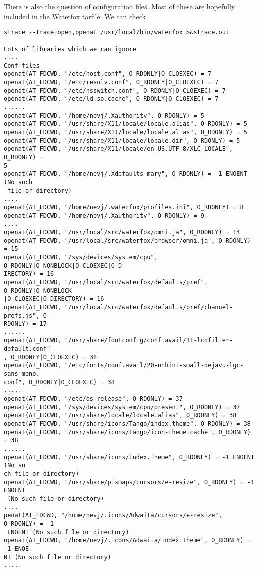 \documentclass{article}  %
\begin{document}
There is also the question of configuration files. Most of these are hopefully included in the Waterfox tarfile. We can check
\begin{verbatim}
strace --trace=open,openat /usr/local/bin/waterfox >&strace.out

Lots of libraries which we can ignore
....
Conf files
openat(AT_FDCWD, "/etc/host.conf", O_RDONLY|O_CLOEXEC) = 7
openat(AT_FDCWD, "/etc/resolv.conf", O_RDONLY|O_CLOEXEC) = 7
openat(AT_FDCWD, "/etc/nsswitch.conf", O_RDONLY|O_CLOEXEC) = 7
openat(AT_FDCWD, "/etc/ld.so.cache", O_RDONLY|O_CLOEXEC) = 7
......
openat(AT_FDCWD, "/home/nevj/.Xauthority", O_RDONLY) = 5
openat(AT_FDCWD, "/usr/share/X11/locale/locale.alias", O_RDONLY) = 5
openat(AT_FDCWD, "/usr/share/X11/locale/locale.alias", O_RDONLY) = 5
openat(AT_FDCWD, "/usr/share/X11/locale/locale.dir", O_RDONLY) = 5
openat(AT_FDCWD, "/usr/share/X11/locale/en_US.UTF-8/XLC_LOCALE", O_RDONLY) = 
5
openat(AT_FDCWD, "/home/nevj/.Xdefaults-mary", O_RDONLY) = -1 ENOENT (No such
 file or directory)
....
openat(AT_FDCWD, "/home/nevj/.waterfox/profiles.ini", O_RDONLY) = 8
openat(AT_FDCWD, "/home/nevj/.Xauthority", O_RDONLY) = 9
....
openat(AT_FDCWD, "/usr/local/src/waterfox/omni.ja", O_RDONLY) = 14
openat(AT_FDCWD, "/usr/local/src/waterfox/browser/omni.ja", O_RDONLY) = 15
openat(AT_FDCWD, "/sys/devices/system/cpu", O_RDONLY|O_NONBLOCK|O_CLOEXEC|O_D
IRECTORY) = 16
openat(AT_FDCWD, "/usr/local/src/waterfox/defaults/pref", O_RDONLY|O_NONBLOCK
|O_CLOEXEC|O_DIRECTORY) = 16
openat(AT_FDCWD, "/usr/local/src/waterfox/defaults/pref/channel-prefs.js", O_
RDONLY) = 17
......
openat(AT_FDCWD, "/usr/share/fontconfig/conf.avail/11-lcdfilter-default.conf"
, O_RDONLY|O_CLOEXEC) = 38
openat(AT_FDCWD, "/etc/fonts/conf.avail/20-unhint-small-dejavu-lgc-sans-mono.
conf", O_RDONLY|O_CLOEXEC) = 38
.....
openat(AT_FDCWD, "/etc/os-release", O_RDONLY) = 37
openat(AT_FDCWD, "/sys/devices/system/cpu/present", O_RDONLY) = 37
openat(AT_FDCWD, "/usr/share/locale/locale.alias", O_RDONLY) = 38
openat(AT_FDCWD, "/usr/share/icons/Tango/index.theme", O_RDONLY) = 38
openat(AT_FDCWD, "/usr/share/icons/Tango/icon-theme.cache", O_RDONLY) = 38
......
openat(AT_FDCWD, "/usr/share/icons/index.theme", O_RDONLY) = -1 ENOENT (No su
ch file or directory)
openat(AT_FDCWD, "/usr/share/pixmaps/cursors/e-resize", O_RDONLY) = -1 ENOENT
 (No such file or directory)
....
penat(AT_FDCWD, "/home/nevj/.icons/Adwaita/cursors/e-resize", O_RDONLY) = -1
 ENOENT (No such file or directory)
openat(AT_FDCWD, "/home/nevj/.icons/Adwaita/index.theme", O_RDONLY) = -1 ENOE
NT (No such file or directory)
.....

\end{verbatim}
\end{document}
